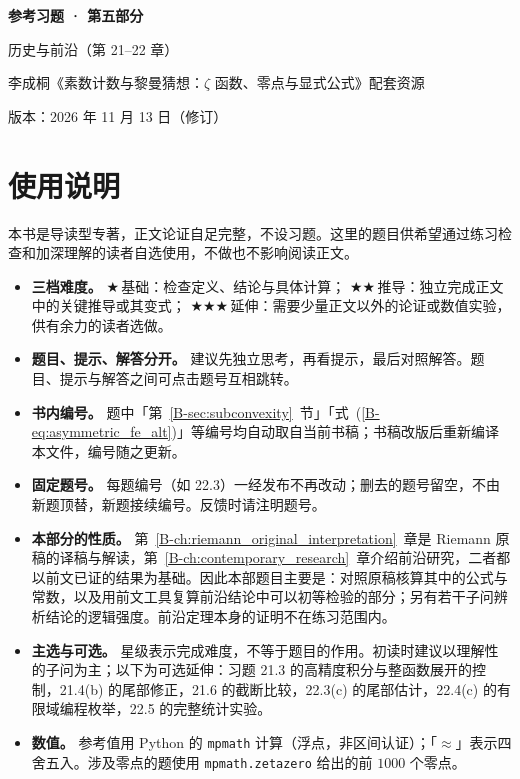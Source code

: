 \documentclass[11pt,a4paper]{article}
\newcommand{\bref}[1]{\ref*{B-#1}}
\newcommand{\lvI}{$\bigstar$\,基础}
\newcommand{\lvII}{$\bigstar\bigstar$\,推导}
\newcommand{\lvIII}{$\bigstar\bigstar\bigstar$\,延伸}
\newcommand{\versiondate}{2026 年 11 月 13 日（修订）}
\begin{document}
\begin{center}
{\LARGE\bfseries 参考习题 · 第五部分\par}
\vspace{0.6em}
{\large 历史与前沿（第 21–22 章）\par}
\vspace{0.6em}
{\normalsize 李成桐《素数计数与黎曼猜想：$\zeta$ 函数、零点与显式公式》配套资源\par}
\vspace{0.3em}
{\small 版本：\versiondate\par}
\end{center}

\vspace{0.8em}
\section*{使用说明}

本书是导读型专著，正文论证自足完整，不设习题。这里的题目供希望通过练习检查和加深理解的读者自选使用，不做也不影响阅读正文。

\begin{itemize}
  \item \textbf{三档难度。}
    \lvI：检查定义、结论与具体计算；
    \lvII：独立完成正文中的关键推导或其变式；
    \lvIII：需要少量正文以外的论证或数值实验，供有余力的读者选做。
  \item \textbf{题目、提示、解答分开。}
    建议先独立思考，再看提示，最后对照解答。题目、提示与解答之间可点击题号互相跳转。
  \item \textbf{书内编号。}
    题中「第~\bref{sec:subconvexity}~节」「式~(\bref{eq:asymmetric_fe_alt})」等编号均自动取自当前书稿；书稿改版后重新编译本文件，编号随之更新。
  \item \textbf{固定题号。}
    每题编号（如 22.3）一经发布不再改动；删去的题号留空，不由新题顶替，新题接续编号。反馈时请注明题号。
  \item \textbf{本部分的性质。}
    第~\bref{ch:riemann_original_interpretation}~章是 Riemann 原稿的译稿与解读，第~\bref{ch:contemporary_research}~章介绍前沿研究，二者都以前文已证的结果为基础。因此本部题目主要是：对照原稿核算其中的公式与常数，以及用前文工具复算前沿结论中可以初等检验的部分；另有若干子问辨析结论的逻辑强度。前沿定理本身的证明不在练习范围内。
  \item \textbf{主选与可选。}
    星级表示完成难度，不等于题目的作用。初读时建议以理解性的子问为主；以下为可选延伸：习题 21.3 的高精度积分与整函数展开的控制，21.4(b) 的尾部修正，21.6 的截断比较，22.3(c) 的尾部估计，22.4(c) 的有限域编程枚举，22.5 的完整统计实验。
  \item \textbf{数值。}
    参考值用 Python 的 \texttt{mpmath} 计算（浮点，非区间认证）；「$\approx$」表示四舍五入。涉及零点的题使用 \texttt{mpmath.zetazero} 给出的前 $1000$ 个零点。
\end{itemize}
\end{document}
